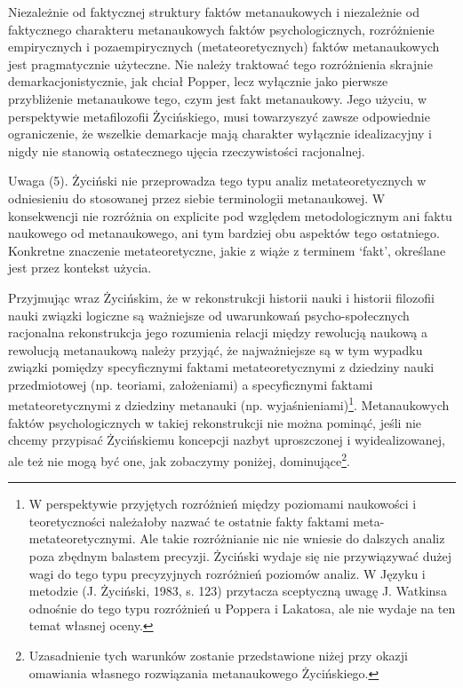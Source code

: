 \documentclass{article}
\begin{document}
Niezależnie od faktycznej struktury faktów metanaukowych i niezależnie od faktycznego charakteru metanaukowych faktów
psychologicznych, rozróżnienie empirycznych i pozaempirycznych (metateoretycznych) faktów metanaukowych jest
pragmatycznie użyteczne. Nie należy traktować tego rozróżnienia skrajnie demarkacjonistycznie, jak chciał Popper, lecz
wyłącznie jako pierwsze przybliżenie metanaukowe tego, czym jest fakt metanaukowy. Jego użyciu, w perspektywie
metafilozofii Życińskiego, musi towarzyszyć zawsze odpowiednie ograniczenie, że wszelkie demarkacje mają charakter
wyłącznie idealizacyjny i nigdy nie stanowią ostatecznego ujęcia rzeczywistości racjonalnej.

Uwaga (5). Życiński nie przeprowadza tego typu analiz metateoretycznych w odniesieniu do stosowanej przez siebie
terminologii metanaukowej. W konsekwencji nie rozróżnia on explicite pod względem metodologicznym ani faktu naukowego
od metanaukowego, ani tym bardziej obu aspektów tego ostatniego. Konkretne znaczenie metateoretyczne, jakie z wiąże z
terminem ‘fakt’, określane jest przez kontekst użycia.

Przyjmując wraz Życińskim, że w rekonstrukcji historii nauki i historii filozofii nauki związki logiczne są ważniejsze
od uwarunkowań psycho-społecznych racjonalna rekonstrukcja jego rozumienia relacji między rewolucją naukową a rewolucją
metanaukową należy przyjąć, że najważniejsze są w tym wypadku związki pomiędzy specyficznymi faktami metateoretycznymi
z dziedziny nauki przedmiotowej (np. teoriami, założeniami) a specyficznymi faktami metateoretycznymi z dziedziny
metanauki (np. wyjaśnieniami)\footnote{W perspektywie przyjętych rozróżnień między poziomami naukowości i
teoretyczności należałoby nazwać te ostatnie fakty faktami meta-metateoretycznymi. Ale takie rozróżnianie nic nie
wniesie do dalszych analiz poza zbędnym balastem precyzji. Życiński wydaje się nie przywiązywać dużej wagi do tego typu
precyzyjnych rozróżnień poziomów analiz. W Języku i metodzie \label{ref:RNDqQTlKikSxt}(J. Życiński, 1983, s. 123)
przytacza sceptyczną uwagę J. Watkinsa odnośnie do tego typu rozróżnień u Poppera i Lakatosa, ale nie wydaje na ten
temat własnej oceny.}. Metanaukowych faktów psychologicznych w takiej rekonstrukcji nie można pominąć, jeśli nie chcemy
przypisać Życińskiemu koncepcji nazbyt uproszczonej i wyidealizowanej, ale też nie mogą być one, jak zobaczymy poniżej,
dominujące\footnote{Uzasadnienie tych warunków zostanie przedstawione niżej przy okazji omawiania własnego rozwiązania
metanaukowego Życińskiego.}.
\end{document}
